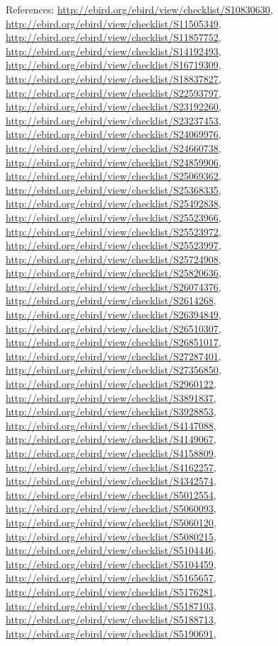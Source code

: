 \documentclass[9pt, article]{memoir}
\begin{document}
\begin{multicols}{2}
\vspace{6pt}References: 
\url{http://ebird.org/ebird/view/checklist/S10830630}, 
\url{http://ebird.org/ebird/view/checklist/S11505349}, 
\url{http://ebird.org/ebird/view/checklist/S11857752}, 
\url{http://ebird.org/ebird/view/checklist/S14192493}, 
\url{http://ebird.org/ebird/view/checklist/S16719309}, 
\url{http://ebird.org/ebird/view/checklist/S18837827}, 
\url{http://ebird.org/ebird/view/checklist/S22593797}, 
\url{http://ebird.org/ebird/view/checklist/S23192260}, 
\url{http://ebird.org/ebird/view/checklist/S23237453}, 
\url{http://ebird.org/ebird/view/checklist/S24069976}, 
\url{http://ebird.org/ebird/view/checklist/S24660738}, 
\url{http://ebird.org/ebird/view/checklist/S24859906}, 
\url{http://ebird.org/ebird/view/checklist/S25069362}, 
\url{http://ebird.org/ebird/view/checklist/S25368335}, 
\url{http://ebird.org/ebird/view/checklist/S25492838}, 
\url{http://ebird.org/ebird/view/checklist/S25523966}, 
\url{http://ebird.org/ebird/view/checklist/S25523972}, 
\url{http://ebird.org/ebird/view/checklist/S25523997}, 
\url{http://ebird.org/ebird/view/checklist/S25724908}, 
\url{http://ebird.org/ebird/view/checklist/S25820636}, 
\url{http://ebird.org/ebird/view/checklist/S26074376}, 
\url{http://ebird.org/ebird/view/checklist/S2614268}, 
\url{http://ebird.org/ebird/view/checklist/S26394849}, 
\url{http://ebird.org/ebird/view/checklist/S26510307}, 
\url{http://ebird.org/ebird/view/checklist/S26851017}, 
\url{http://ebird.org/ebird/view/checklist/S27287401}, 
\url{http://ebird.org/ebird/view/checklist/S27356850}, 
\url{http://ebird.org/ebird/view/checklist/S2960122}, 
\url{http://ebird.org/ebird/view/checklist/S3891837}, 
\url{http://ebird.org/ebird/view/checklist/S3928853}, 
\url{http://ebird.org/ebird/view/checklist/S4147088}, 
\url{http://ebird.org/ebird/view/checklist/S4149067}, 
\url{http://ebird.org/ebird/view/checklist/S4158809}, 
\url{http://ebird.org/ebird/view/checklist/S4162257}, 
\url{http://ebird.org/ebird/view/checklist/S4342574}, 
\url{http://ebird.org/ebird/view/checklist/S5012554}, 
\url{http://ebird.org/ebird/view/checklist/S5060093}, 
\url{http://ebird.org/ebird/view/checklist/S5060120}, 
\url{http://ebird.org/ebird/view/checklist/S5080215}, 
\url{http://ebird.org/ebird/view/checklist/S5104446}, 
\url{http://ebird.org/ebird/view/checklist/S5104459}, 
\url{http://ebird.org/ebird/view/checklist/S5165657}, 
\url{http://ebird.org/ebird/view/checklist/S5176281}, 
\url{http://ebird.org/ebird/view/checklist/S5187103}, 
\url{http://ebird.org/ebird/view/checklist/S5188713}, 
\url{http://ebird.org/ebird/view/checklist/S5190691}, 

\end{multicols}
\end{document}
